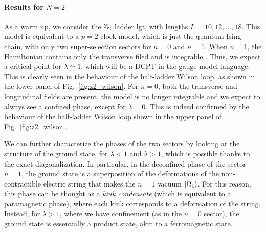 \smallskip

%     



\paragraph{Results for \texorpdfstring{$N=2$}{N=2}}
As a warm up, we consider the $\mathbb{Z}_2$ ladder \ac{lgt}, with lengths $L=10,12,\dots,18$.
This model is equivalent to a $p=2$ clock model, which is just the quantum Ising chain, with only two super-selection sectors for $n=0$ and $n=1$.
When $n=1$, the Hamiltonian  contains only the transverse filed and is integrable \cite{baxter1982exactlysm}.
Thus, we expect a critical point for $\lambda \simeq 1$, which will be a DCPT in the gauge model language.
This is clearly seen in the behaviour of the half-ladder Wilson loop, as shown in the lower panel of Fig.~\ref{fig:z2_wilson}.
For $n=0$, both the transverse and longitudinal fields  are present, the model is no longer integrable  \cite{banuls2011thermalization, kormos2017confinement, pomponio2022bloch} and we expect to always see a confined phase, except for $\lambda = 0$.
This is indeed confirmed by the behaviour of the half-ladder Wilson loop shown in the upper panel of Fig.~\ref{fig:z2_wilson}.

We can further characterize the phases of the two sectors by looking at the structure of the ground state, for $\lambda<1$ and $\lambda>1$, which is possible thanks to the exact diagonalization.
In particular, in the deconfined phase of the sector $n=1$, the ground state is a superposition of the deformations of the non-contractible electric string that makes the $n=1$ vacuum $\ket{\Omega_1}$.
For this reason, this phase can be thought as a \emph{kink condensate} \cite{fradkin1978order} (which is equivalent to a paramagnetic phase), where each kink corresponds to a deformation of the string.
Instead, for $\lambda > 1$, where we have confinement (as in the $n=0$ sector), the ground state is essentially a product state, akin to a ferromagnetic state. %


